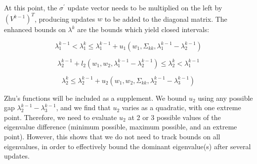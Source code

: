\documentclass{article}
\begin{document}
At this point, the $\sigma^\prime$ update vector needs to be multiplied on the left by $\left(V^{k-1}\right)^T$, producing updates $w$ to be added to the diagonal matrix. The enhanced bounds on $\lambda^k$ \cite{zhu2019rank} are the bounds which yield closed intervals:

$$
\lambda^{k-1}_1
<
\lambda^k_1
\le
\lambda^{k-1}_1 + u_1(w_1, \Sigma_{kk}, \lambda^{k-1}_1 - \lambda^{k-1}_2)
$$

$$
\lambda^{k-1}_2
+
l_2(w_1, w_2, \lambda^{k-1}_1 - \lambda^{k-1}_2)
\le
\lambda^k_2
<
\lambda^{k-1}_1
$$

$$
\lambda^k_2
\le
\lambda^{k-1}_2
+
u_2(w_1, w_2, \Sigma_{kk}, \lambda^{k-1}_2 - \lambda^{k-1}_3)
$$









Zhu's functions will be included as a supplement. We bound $u_2$ using any possible gap $\lambda_2^{k-1} - \lambda_3^{k-1}$, and we find that $u_2$ varies as a quadratic, with one extreme point. Therefore, we need to evaluate $u_2$ at 2 or 3 possible values of the eigenvalue difference (minimum possible, maximum possible, and an extreme point). However, this shows that we do not need to track bounds on all eigenvalues, in order to effectively bound the dominant eigenvalue(s) after several updates.
\end{document}
